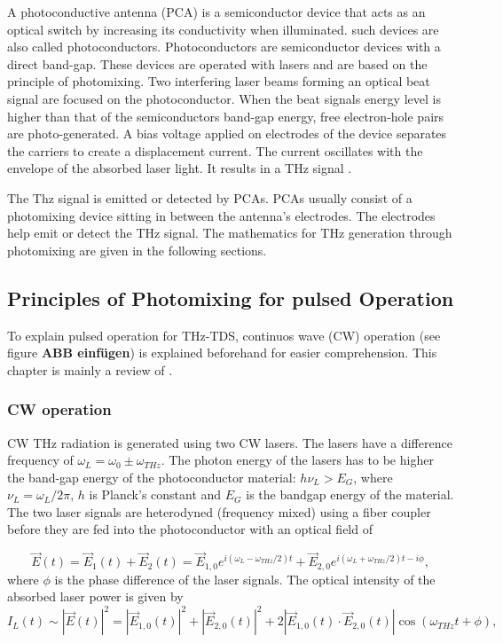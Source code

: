 A photoconductive antenna (PCA) is a semiconductor device that acts as an optical switch by increasing its conductivity when illuminated. such devices are also called photoconductors. 
Photoconductors are semiconductor devices with a direct band-gap. These devices are operated with lasers and are based on the principle of photomixing. Two interfering laser beams forming an optical beat signal are focused on the photoconductor. When the beat signals energy level is higher than that of the semiconductors band-gap energy, free electron-hole pairs are photo-generated. A bias voltage applied on electrodes of the device separates the carriers to create a displacement current. The current oscillates with the envelope of the absorbed laser light. It results in a THz signal \cite{nandiErAsInAlGaAsPhotoconductors2021}. 

The Thz signal is emitted or detected by PCAs. PCAs usually consist of a photomixing device sitting in between the antenna's electrodes. The electrodes help emit or detect the THz signal. The mathematics for THz generation through photomixing are given in the following sections.

\subsection{Principles of Photomixing for pulsed Operation}
To explain pulsed operation for THz-TDS, continuos wave (CW) operation (see figure \textbf{ABB einfügen}) is explained beforehand for easier comprehension. This chapter is mainly a review of \cite{nandiErAsInAlGaAsPhotoconductors2021,faridiPulsedFreeSpace2023,preuPrinciplesTHzGeneration2015}.

\subsubsection{CW operation}
CW THz radiation is generated using two CW lasers. The lasers have a difference frequency of $\omega_L = \omega_0 \pm \omega_{THz}$. The photon energy of the lasers has to be higher the band-gap energy of the photoconductor material: $h\nu_L > E_G$, 
where $\nu_L = \omega_L / 2\pi$, $h$ is Planck’s constant and $E_G$ is the bandgap energy of the material. The two laser signals are heterodyned (frequency mixed) using a fiber coupler before they are fed into the photoconductor with an optical field of

\begin{equation}
	\vec{E}(t) = \vec{E}_1(t) + \vec{E}_2(t) = \vec{E}_{1,0}e^{i(\omega_L - \omega_{THz}/2)t} + \vec{E}_{2,0}e^{i(\omega_L + \omega_{THz}/2)t - i\phi},
\end{equation}
where $\phi$ is the phase difference of the laser signals. The optical intensity of the absorbed laser power is given by 
\begin{equation}
	I_L(t) \sim |\vec{E}(t)|^2 = |\vec{E}_{1,0}(t)|^2 + |\vec{E}_{2,0}(t)|^2 + 2|\vec{E}_{1,0}(t) \cdot \vec{E}_{2,0}(t)|\cos(\omega_{THz}t + \phi), 
\end{equation}


